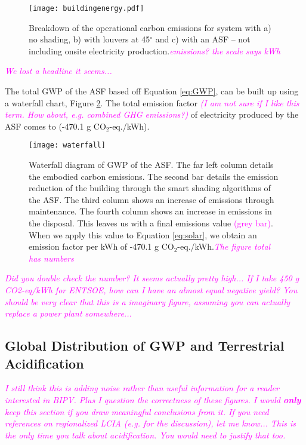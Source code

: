 \begin{figure}[H]
\begin{center}
\texttt{[image: buildingenergy.pdf]}
\caption{Breakdown of the operational carbon emissions for system with a) no shading, b) with louvers at 45$^\circ$ and c) with an ASF -- not including onsite electricity production.\textcolor{magenta}{\textit{emissions? the scale says kWh}}}
\label{fig:operational}
\end{center}
\end{figure}

\textcolor{magenta}{\textit{We lost a headline it seems...}}


The total GWP of the ASF based off Equation \ref{eq:GWP}, can be built up using a waterfall chart, Figure \ref{fig:waterfall}. The total emission factor \textcolor{magenta}{\textit{(I am not sure if I like this term. How about, e.g. combined GHG emissions?)}} of electricity produced by the ASF comes to (-470.1 g CO$_2$-eq./kWh).\\

\begin{figure}[H]
\begin{center}
\texttt{[image: waterfall]}
\caption{Waterfall diagram of GWP of the ASF. The far left column details the embodied carbon emissions. The second bar details the emission reduction of the building through the smart shading algorithms of the ASF. The third column shows an increase of emissions through maintenance. The fourth column shows an increase in emissions in the disposal. This leaves us with a final emissions value \textcolor{magenta}{(grey bar)}. When we apply this value to Equation \ref{eq:solar}, we obtain an emission factor per kWh of -470.1 g CO$_2$-eq./kWh.\textcolor{magenta}{\textit{The figure total has numbers}}}
\label{fig:waterfall}
\end{center}
\end{figure}

\textcolor{magenta}{\textit{Did you double check the number? It seems actually pretty high... If I take 450 g CO2-eq/kWh for ENTSOE, how can I have an almost equal negative yield? You should be very clear that this is a imaginary figure, assuming you can actually replace a power plant somewhere...}}

\subsection{Global Distribution of GWP and Terrestrial Acidification}
\textcolor{magenta}{\textit{I still think this is adding noise rather than useful information for a reader interested in BIPV. Plus I question the correctness of these figures. I would \textbf{only} keep this section if you draw meaningful conclusions from it. If you need references on regionalized LCIA (e.g. for the discussion), let me know... This is the only time you talk about acidification. You would need to justify that too.}}


